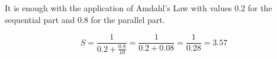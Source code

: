 

\begin{comparchsol}
\end{comparchsol}

It is enough with the application of Amdahl's Law with values
$0.2$ for the sequential part and $0.8$ for the parallel part.

\[
S = \frac{1}{0.2 + \frac{0.8}{10}} = \frac{1}{0.2 + 0.08} = \frac{1}{0.28} =
3.57
\]
